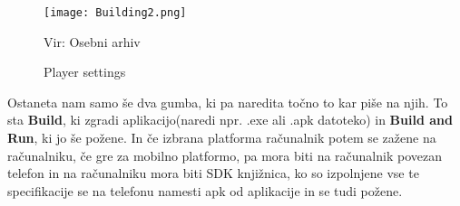 \begin{figure}[ht!]
	\centering
	\texttt{[image: Building2.png]}
	\caption{Player settings}
	{\tiny Vir: Osebni arhiv}
\end{figure}
Ostaneta nam samo še dva gumba, ki pa naredita točno to kar piše na njih. To sta \textbf{Build}, ki zgradi aplikacijo(naredi npr. .exe ali .apk datoteko) in \textbf{Build and Run}, ki jo še požene. In če izbrana platforma računalnik potem se zažene na računalniku, če gre za mobilno platformo, pa mora biti na računalnik povezan telefon in na računalniku mora biti SDK knjižnica, ko so izpolnjene vse te specifikacije se na telefonu namesti apk od aplikacije in se tudi požene.